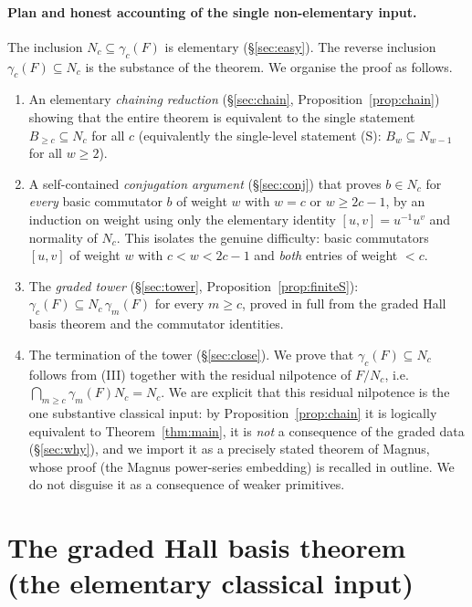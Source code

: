\documentclass{amsart}
\theoremstyle{definition}
\theoremstyle{remark}
\begin{document}
\paragraph{Plan and honest accounting of the single non-elementary input.}
The inclusion $N_c\subseteq\gamma_c(F)$ is elementary (\S\ref{sec:easy}). The
reverse inclusion $\gamma_c(F)\subseteq N_c$ is the substance of the theorem. We
organise the proof as follows.
\begin{enumerate}
\item[(I)] An elementary \emph{chaining reduction} (\S\ref{sec:chain},
Proposition~\ref{prop:chain}) showing that the entire theorem is equivalent to the
single statement $B_{\ge c}\subseteq N_c$ for all $c$ (equivalently the
single-level statement (S): $B_w\subseteq N_{w-1}$ for all $w\ge2$).
\item[(II)] A self-contained \emph{conjugation argument} (\S\ref{sec:conj}) that
proves $b\in N_c$ for \emph{every} basic commutator $b$ of weight $w$ with $w=c$
or $w\ge 2c-1$, by an induction on weight using only the elementary identity
$[u,v]=u^{-1}u^{v}$ and normality of $N_c$. This isolates the genuine difficulty:
basic commutators $[u,v]$ of weight $w$ with $c<w<2c-1$ and \emph{both} entries of
weight $<c$.
\item[(III)] The \emph{graded tower} (\S\ref{sec:tower},
Proposition~\ref{prop:finiteS}): $\gamma_c(F)\subseteq N_c\,\gamma_m(F)$ for every
$m\ge c$, proved in full from the graded Hall basis theorem and the commutator
identities.
\item[(IV)] The termination of the tower (\S\ref{sec:close}). We prove that
$\gamma_c(F)\subseteq N_c$ follows from (III) together with the residual
nilpotence of $F/N_c$, i.e.\ $\bigcap_{m\ge c}\gamma_m(F)N_c=N_c$. We are explicit
that this residual nilpotence is the one substantive classical input: by
Proposition~\ref{prop:chain} it is logically equivalent to
Theorem~\ref{thm:main}, it is \emph{not} a consequence of the graded data
(\S\ref{sec:why}), and we import it as a precisely stated theorem of Magnus, whose
proof (the Magnus power-series embedding) is recalled in outline. We do not disguise
it as a consequence of weaker primitives.
\end{enumerate}

\section{The graded Hall basis theorem (the elementary classical input)}
\label{sec:input}
\end{document}
